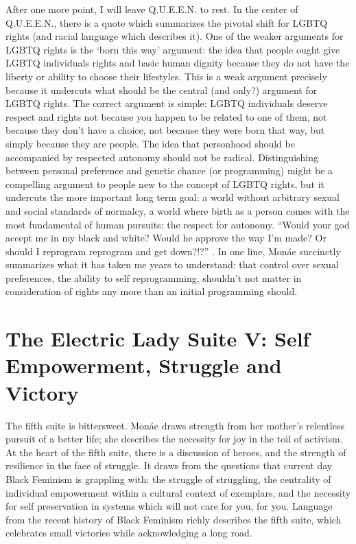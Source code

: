 \documentclass[a4paper, 11pt]{article} %
\begin{document}
After one more point, I will leave Q.U.E.E.N. to rest.
In the center of Q.U.E.E.N., there is a quote which summarizes the pivotal shift for LGBTQ rights (and racial language which describes it).
One of the weaker arguments for LGBTQ rights is the `born this way' argument: the idea that people ought give LGBTQ individuals rights and basic human dignity because they do not have the liberty or ability to choose their lifestyles.
This is a weak argument precisely because it undercuts what should be the central (and only?) argument for LGBTQ rights.
The correct argument is simple: LGBTQ individuals deserve respect and rights not because you happen to be related to one of them, not because they don't have a choice, not because they were born that way, but simply because they are people.
The idea that personhood should be accompanied by respected autonomy should not be radical.
Distinguishing between personal preference and genetic chance (or programming) might be a compelling argument to people new to the concept of LGBTQ rights, but it undercuts the more important long term goal: a world without arbitrary sexual and social standards of normalcy, a world where birth as a person comes with the most fundamental of human pursuits: the respect for autonomy. 
``Would your god accept me in my black and white? Would he approve the way I'm made? Or should I reprogram reprogram and get down?!?'' .
In one line, Mon\'ae succinctly summarizes what it has taken me years to understand: that control over sexual preferences, the ability to self reprogramming, shouldn't not matter in consideration of rights any more than an initial programming should.



\section*{The Electric Lady Suite V: Self Empowerment, Struggle and Victory}

The fifth suite is bittersweet.
Mon\'ae draws strength from her mother's relentless pursuit of a better life; she describes the necessity for joy in the toil of activism.
At the heart of the fifth suite, there is a discussion of heroes, and the strength of resilience in the face of struggle.
It draws from the questions that current day Black Feminism is grappling with: the struggle of struggling, the centrality of individual empowerment within a cultural context of exemplars, and the necessity for self preservation in systems which will not care for you, for you.
Language from the recent history of Black Feminism richly describes the fifth suite, which celebrates small victories while acknowledging a long road.
\end{document}
